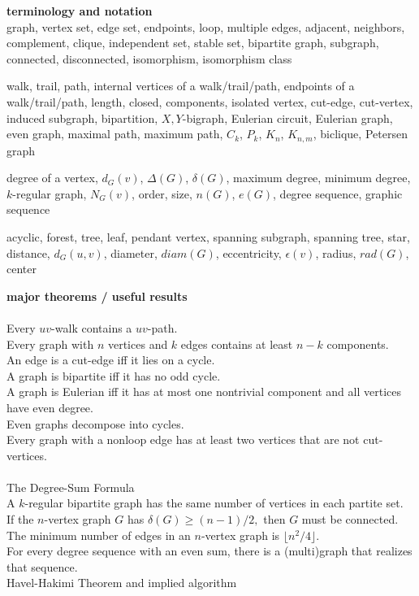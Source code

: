 \documentclass[12pt]{article}
\theoremstyle{homework}
\begin{document}
\noindent \textbf{terminology and notation}\\

  graph, vertex set, edge set, endpoints, loop, multiple edges, adjacent, neighbors, complement, clique, independent set, stable set, bipartite graph, subgraph, connected, disconnected, isomorphism, isomorphism class


  walk, trail, path, internal vertices of a walk/trail/path, endpoints of a walk/trail/path, length, closed, components, isolated vertex, cut-edge, cut-vertex, induced subgraph, bipartition, $X,Y$-bigraph, Eulerian circuit, Eulerian graph, even graph, maximal path, maximum path, $C_k$, $P_k$, $K_n$, $K_{n,m}$, biclique, Petersen graph

 degree of a vertex, $d_G(v)$, $\Delta(G)$, $\delta(G)$, maximum degree, minimum degree, $k$-regular graph, $N_G(v)$, order, size, $n(G)$, $e(G)$, degree sequence, graphic sequence

 acyclic, forest, tree, leaf, pendant vertex, spanning subgraph, spanning tree, star, distance, $d_G(u,v)$, diameter, $diam(G)$, eccentricity, $\epsilon(v)$, radius, $rad(G)$, center

\vspace{.3in}

\noindent \textbf{major theorems / useful results}\\

\\
Every $uv$-walk contains a $uv$-path.\\
Every graph with $n$ vertices and $k$ edges contains at least $n-k$ components.\\
An edge is a cut-edge iff it lies on a cycle.\\
A graph is bipartite iff it has no odd cycle.\\
A graph is Eulerian iff it has at most one nontrivial component and all vertices have even degree.\\
Even graphs decompose into cycles.\\
Every graph with a nonloop edge has at least two vertices that are not cut-vertices.\\

\\
The Degree-Sum Formula\\
A $k$-regular bipartite graph has the same number of vertices in each partite set.\\
If the $n$-vertex graph $G$ has $\delta(G) \geq (n-1)/2,$ then $G$ must be connected.\\
The minimum number of edges in an $n$-vertex graph is $\lfloor n^2/4 \rfloor.$\\
For every degree sequence with an even sum, there is a (multi)graph that realizes that sequence.\\
Havel-Hakimi Theorem and implied algorithm\\
\end{document}
